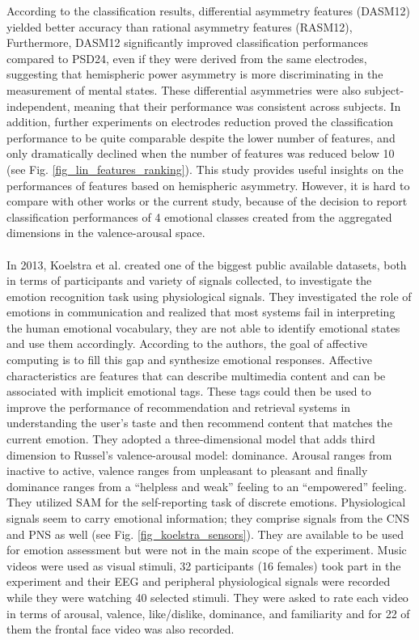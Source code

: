 According to the classification results, differential asymmetry features (DASM12) yielded better accuracy than rational asymmetry features (RASM12), Furthermore, DASM12 significantly improved classification performances compared to PSD24, even if they were derived from the same electrodes, suggesting that hemispheric power asymmetry is more discriminating in the measurement of mental states. These differential asymmetries were also subject-independent, meaning that their performance was consistent across subjects. In addition, further experiments on electrodes reduction proved the classification performance to be quite comparable despite the lower number of features, and only dramatically declined when the number of features was reduced below 10 (see Fig. \ref{fig_lin_features_ranking}). This study provides useful insights on the performances of features based on hemispheric asymmetry. However, it is hard to compare with other works or the current study, because of the decision to report classification performances of 4 emotional classes created from the aggregated dimensions in the valence-arousal space.
\\
\\
In 2013, Koelstra et al. \cite{koelstra_deap_2012} created one of the biggest public available datasets, both in terms of participants and variety of signals collected, to investigate the emotion recognition task using physiological signals. They investigated the role of emotions in communication and realized that most systems fail in interpreting the human emotional vocabulary, they are not able to identify emotional states and use them accordingly. According to the authors, the goal of affective computing is to fill this gap and synthesize emotional responses. Affective characteristics are features that can describe multimedia content and can be associated with implicit emotional tags. These tags could then be used to improve the performance of recommendation and retrieval systems in understanding the user’s taste and then recommend content that matches the current emotion.
They adopted a three-dimensional model that adds third dimension to Russel’s valence-arousal model: dominance. Arousal ranges from inactive to active, valence ranges from unpleasant to pleasant and finally dominance ranges from a “helpless and weak” feeling to an “empowered” feeling. They utilized \ac{SAM} \cite{bradley_measuring_1994} for the self-reporting task of discrete emotions.
Physiological signals seem to carry emotional information; they comprise signals from the \ac{CNS} and \ac{PNS} as well (see Fig. \ref{fig_koelstra_sensors}). They are available to be used for emotion assessment but were not in the main scope of the experiment. Music videos were used as visual stimuli, 32 participants (16 females) took part in the experiment and their \ac{EEG} and peripheral physiological signals were recorded while they were watching 40 selected stimuli. They were asked to rate each video in terms of arousal, valence, like/dislike, dominance, and familiarity and for 22 of them the frontal face video was also recorded.
